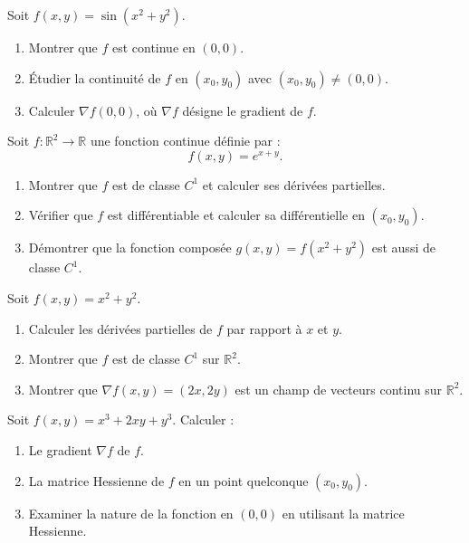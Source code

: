 \begin{exercice}
Soit \( f(x, y) = \sin(x^2 + y^2) \). 
\begin{enumerate}
    \item Montrer que \( f \) est continue en \( (0, 0) \).
    \item Étudier la continuité de \( f \) en \( (x_0, y_0) \) avec \( (x_0, y_0) \neq (0, 0) \).
    \item Calculer \( \nabla f(0, 0) \), où \( \nabla f \) désigne le gradient de \( f \).
\end{enumerate}
\end{exercice}

\begin{exercice}
Soit \( f : \mathbb{R}^2 \to \mathbb{R} \) une fonction continue définie par :
\[
f(x, y) = e^{x + y}.
\]
\begin{enumerate}
    \item Montrer que \( f \) est de classe \( C^1 \) et calculer ses dérivées partielles.
    \item Vérifier que \( f \) est différentiable et calculer sa différentielle en \( (x_0, y_0) \).
    \item Démontrer que la fonction composée \( g(x, y) = f(x^2 + y^2) \) est aussi de classe \( C^1 \).
\end{enumerate}
\end{exercice}

\begin{exercice}
Soit \( f(x, y) = x^2 + y^2 \).
\begin{enumerate}
    \item Calculer les dérivées partielles de \( f \) par rapport à \( x \) et \( y \).
    \item Montrer que \( f \) est de classe \( C^1 \) sur \( \mathbb{R}^2 \).
    \item Montrer que \( \nabla f(x, y) = (2x, 2y) \) est un champ de vecteurs continu sur \( \mathbb{R}^2 \).
\end{enumerate}
\end{exercice}

\begin{exercice}
Soit \( f(x, y) = x^3 + 2xy + y^3 \). Calculer :
\begin{enumerate}
    \item Le gradient \( \nabla f \) de \( f \).
    \item La matrice Hessienne de \( f \) en un point quelconque \( (x_0, y_0) \).
    \item Examiner la nature de la fonction en \( (0, 0) \) en utilisant la matrice Hessienne.
\end{enumerate}
\end{exercice}

